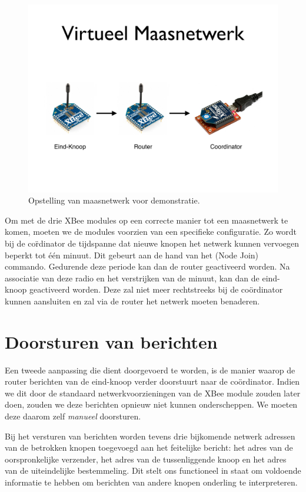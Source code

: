 \begin{figure}[ht]
  \centering
  \includegraphics[width=\linewidth]{resources/xbee-setup.pdf}
  \caption{Opstelling van maasnetwerk voor demonstratie.}
  \label{fig:xbee-setup}
\end{figure}

Om met de drie XBee modules op een correcte manier tot een maasnetwerk te
komen, moeten we de modules voorzien van een specifieke configuratie. Zo wordt
bij de co\"rdinator de tijdspanne dat nieuwe knopen het netwerk kunnen
vervoegen beperkt tot \'e\'en minuut. Dit gebeurt aan de hand van het 
(Node Join) commando. Gedurende deze periode kan dan de router geactiveerd
worden. Na associatie van deze radio en het verstrijken van de minuut, kan dan
de eind-knoop geactiveerd worden. Deze zal niet meer rechtstreeks bij de
co\"ordinator kunnen aansluiten en zal via de router het netwerk moeten
benaderen.

\section{Doorsturen van berichten}

Een tweede aanpassing die dient doorgevoerd te worden, is de manier waarop de
router berichten van de eind-knoop verder doorstuurt naar de co\"ordinator.
Indien we dit door de standaard netwerkvoorzieningen van de XBee module zouden
later doen, zouden we deze berichten opnieuw niet kunnen onderscheppen. We
moeten deze daarom zelf \emph{manueel} doorsturen.

Bij het versturen van berichten worden tevens drie bijkomende netwerk adressen
van de betrokken knopen toegevoegd aan het feitelijke bericht: het adres van de
oorspronkelijke verzender, het adres van de tussenliggende knoop en het adres
van de uiteindelijke bestemmeling. Dit stelt ons functioneel in staat om
voldoende informatie te hebben om berichten van andere knopen onderling te
interpreteren.

